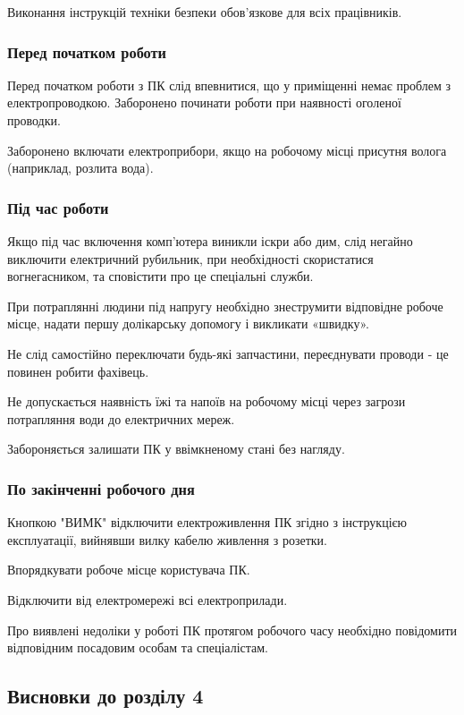     Виконання інструкцій техніки безпеки обов'язкове для всіх працівників.

    \subsubsection{Перед початком роботи}

    Перед початком роботи з ПК слід впевнитися, що у приміщенні немає проблем з електропроводкою. Заборонено починати роботи при наявності оголеної проводки.
    
    Заборонено включати електроприбори, якщо на робочому місці присутня волога (наприклад, розлита вода).
    
    \subsubsection{Під час роботи}
    Якщо під час включення комп'ютера виникли іскри або дим, слід негайно виключити електричний рубильник,
    при необхідності скористатися вогнегасником, та сповістити про це спеціальні служби.

    При потраплянні людини під напругу необхідно знеструмити відповідне робоче місце, надати першу долікарську допомогу і викликати «швидку».

    Не слід самостійно переключати будь-які запчастини, переєднувати проводи - це повинен робити фахівець.

    Не допускається наявність їжі та напоїв на робочому місці через загрози потрапляння води до електричних мереж.

    Забороняється залишати ПК у ввімкненому стані без нагляду.

    \subsubsection{По закінченні робочого дня}
    Кнопкою "ВИМК" відключити електроживлення ПК згідно з інструкцією експлуатації, вийнявши вилку кабелю живлення з розетки.

    Впорядкувати робоче місце користувача ПК.

    Відключити від електромережі всі електроприлади.

    Про виявлені недоліки у роботі ПК протягом робочого часу необхідно повідомити відповідним посадовим
    особам та спеціалістам.

\clearpage
\subsection{Висновки до розділу 4}

